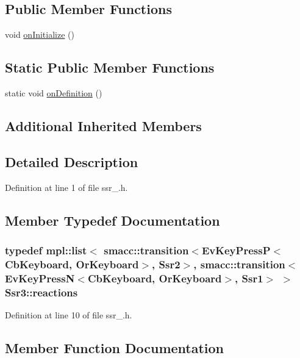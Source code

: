 \subsection*{Public Member Functions}
\begin{DoxyCompactItemize}
\item 
void \hyperlink{structSsr3_aa20ad5030a625d39522d559ebe75feb0}{on\+Initialize} ()
\end{DoxyCompactItemize}
\subsection*{Static Public Member Functions}
\begin{DoxyCompactItemize}
\item 
static void \hyperlink{structSsr3_a57a64c1b26c2967aff8f55077f0b2553}{on\+Definition} ()
\end{DoxyCompactItemize}
\subsection*{Additional Inherited Members}


\subsection{Detailed Description}


Definition at line 1 of file ssr\+\_.\+h.



\subsection{Member Typedef Documentation}
\subsubsection[{\texorpdfstring{reactions}{reactions}}]{\setlength{\rightskip}{0pt plus 5cm}typedef mpl\+::list$<$ {\bf smacc\+::transition}$<$Ev\+Key\+PressP$<$Cb\+Keyboard, Or\+Keyboard$>$, {\bf Ssr2}$>$, {\bf smacc\+::transition}$<$Ev\+Key\+PressN$<$Cb\+Keyboard, Or\+Keyboard$>$, {\bf Ssr1}$>$ $>$ {\bf Ssr3\+::reactions}}\hypertarget{structSsr3_a9b234c7ea95f593cd1fd4049e6f256d8}{}\label{structSsr3_a9b234c7ea95f593cd1fd4049e6f256d8}


Definition at line 10 of file ssr\+\_.\+h.



\subsection{Member Function Documentation}
